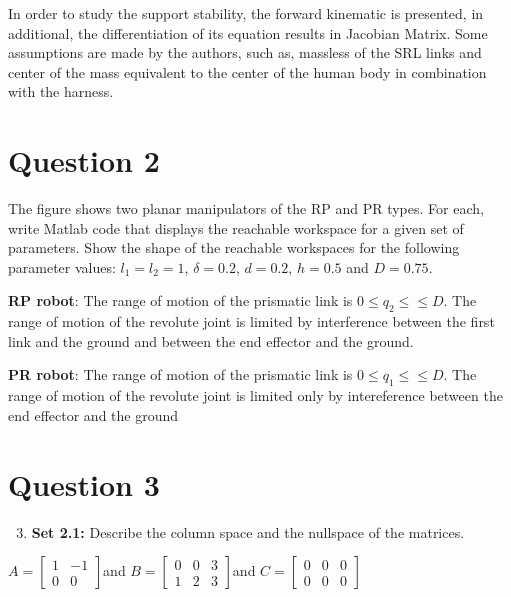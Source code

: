 \documentclass[a4paper,10pt]{article}
\begin{document}
In order to study the support stability, the forward kinematic is presented, in additional, the differentiation of its equation results in Jacobian Matrix. Some assumptions are made by the authors, such as, massless of the SRL links and center of the mass equivalent to the center of the human body in combination with the harness. 

 


\section{Question 2}

The figure shows two planar manipulators of the RP and PR
types. For each, write Matlab code that displays the reachable workspace for
a given set of parameters. Show the shape of the reachable workspaces for
the following parameter values: $l_1 = l_2 = 1$, $\delta = 0.2$, $d = 0.2$, $h = 0.5$ and $D = 0.75$.

\hfill \break
\textbf{RP robot}: The range of motion of the prismatic link is $0 \leq q_2 \leq≤ D$. The
range of motion of the revolute joint is limited by interference between
the first link and the ground and between the end effector and the ground.

\hfill \break
\textbf{PR robot}: The range of motion of the prismatic link is  $0 \leq q_1 \leq≤ D$. The range of
motion of the revolute joint is limited only by intereference between the
end effector and the ground


\section{Question 3}

\begin{enumerate}
 \setcounter{enumi}{2}
 \item \textbf{Set 2.1:} Describe the column space and the nullspace of the matrices.
\end{enumerate}

\begin{center}
 $A=
\begin{bmatrix}
1 & -1 \\
0 & 0
\end{bmatrix}
$and $B = 
\begin{bmatrix}
0 & 0 & 3 \\
1 & 2 & 3
\end{bmatrix}
$and $C = 
\begin{bmatrix}
0 & 0 & 0 \\
0 & 0 & 0
\end{bmatrix}$
\end{center}
\end{document}
